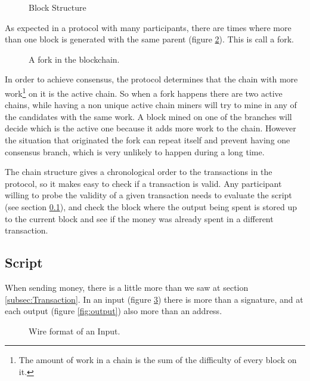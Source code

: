   \begin{figure}[ht]
	\centering
	
	\caption{Block Structure}
	\label{fig:block_pow}
\end{figure}

As expected in a protocol with many participants, there are times where more
  than one block is generated with the same parent (figure
  \ref{fig:chain_fork}). This is call a fork.

\begin{figure}
	\centering
	\def\svgwidth{\columnwidth}
	
	\caption{A fork in the blockchain.}
	\label{fig:chain_fork}
\end{figure}

In order to achieve consensus, the protocol determines that the chain with
  more work\footnote{The amount of work in a chain is the sum of the difficulty
  of every block on it.} on it is the active chain.
So when a fork happens there are two active chains, while having a non unique
  active chain miners will try to mine in any of the candidates with the same
  work.
A block mined on one of the branches will decide which is the active one
  because it adds more work to the chain. However the situation that originated
  the fork can repeat itself and prevent having one consensus branch, which is
  very unlikely\cite{decker2013information} to happen during a long time.

The chain structure gives a chronological order to the transactions in the
  protocol, so it makes easy to check if a transaction is valid.
Any participant willing to probe the validity of a given transaction needs
  to evaluate the script (see section \ref{subsec:script}), and  check the block
  where the output being spent is stored up to the current block and see if the
  money was already spent in a different transaction.

  \subsection{Script} \label{subsec:script}

When sending money, there is a little more than we saw at section
  \ref{subsec:Transaction}. In an input (figure \ref{fig:input}) there is more
  than a signature, and at each output (figure \ref{fig:output}) also more than
  an address.

\begin{figure}[ht]
  \centering
  
  \caption{Wire format of an Input.}
  \label{fig:input}
\end{figure}

